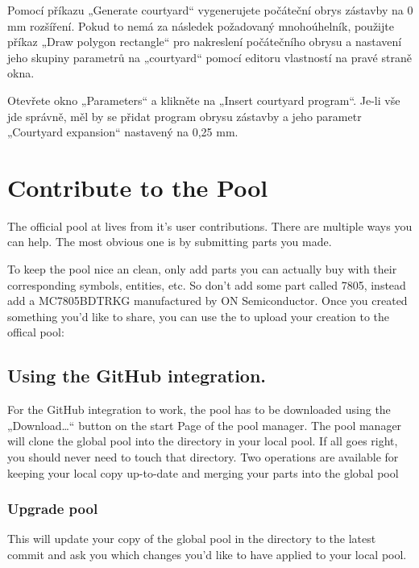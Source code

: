\documentclass[letterpaper,10pt,czech]{sphinxmanual}
\begin{document}
Pomocí příkazu „Generate courtyard“ vygenerujete počáteční obrys zástavby na
0 mm rozšíření. Pokud to nemá za následek požadovaný mnohoúhelník, použijte
příkaz „Draw polygon rectangle“ pro nakreslení počátečního obrysu a nastavení
jeho skupiny parametrů na „courtyard“ pomocí editoru vlastností na
pravé straně okna.

Otevřete okno „Parameters“ a klikněte na „Insert courtyard program“. Je-li
vše jde správně, měl by se přidat program obrysu zástavby a jeho
parametr „Courtyard expansion“ nastavený na 0,25 mm.


\chapter{Contribute to the Pool}
\label{\detokenize{pool-contribute:contribute-to-the-pool}}\label{\detokenize{pool-contribute::doc}}
The official pool at  lives from it’s user
contributions. There are multiple ways you can help. The most obvious one is
by submitting parts you made.

To keep the pool nice an clean, only add parts you can actually buy with
their corresponding symbols, entities, etc. So don’t add some part
called 7805, instead add a MC7805BDTRKG manufactured by ON
Semiconductor. Once you created something you’d like to share, you can use the
{\hyperref[\detokenize{pool-mgr::doc}]{}} to upload your creation to the offical pool:


\section{Using the GitHub integration.}
\label{\detokenize{pool-contribute:using-the-github-integration}}
For the GitHub integration to work, the pool has to be downloaded using
the „Download…“ button on the start Page of the pool manager. The pool
manager will clone the global pool into the  directory in
your local pool. If all goes right, you should never need to touch that
directory. Two operations are available for keeping your local copy
up-to-date and merging your parts into the global pool


\subsection{Upgrade pool}
\label{\detokenize{pool-contribute:upgrade-pool}}
This will update your copy of the global pool in the 
directory to the latest commit and ask you which changes you’d like to
have applied to your local pool.
\end{document}
